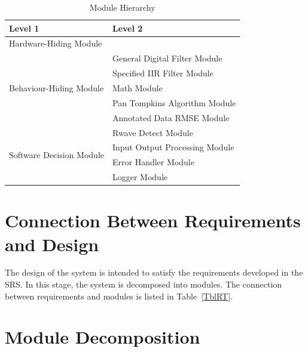\documentclass[12pt, titlepage]{article}
\begin{document}
\begin{table}[h!]
\centering
\begin{tabular}{p{} p{}}
\toprule
\textbf{Level 1} & \textbf{Level 2}\\
\midrule

{Hardware-Hiding Module} & ~ \\
\midrule

\multirow{5}{0.3\textwidth}{Behaviour-Hiding Module}
& General Digital Filter Module \\
& Specified IIR Filter Module \\
& Math Module \\
& Pan Tompkins Algorithm Module \\
& Annotated Data RMSE Module \\
\midrule

\multirow{4}{0.3\textwidth}{Software Decision Module}
& Rwave Detect Module \\
& Input Output Processing Module \\
& Error Handler Module \\
& Logger Module \\
\bottomrule

\end{tabular}
\caption{Module Hierarchy}
\label{TblMH}
\end{table}

\section{Connection Between Requirements and Design} \label{SecConnection}

The design of the system is intended to satisfy the requirements developed in
the SRS. In this stage, the system is decomposed into modules. The connection
between requirements and modules is listed in Table~\ref{TblRT}.


\section{Module Decomposition} \label{SecMD}
\end{document}
